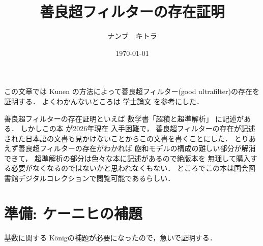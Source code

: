 \documentclass[leqno, a4paper, 12pt]{jsarticle}
\title{
善良超フィルターの存在証明
}
\author{ナンブ　キトラ}
\date{\today}
\begin{document}
\maketitle



この文章では
Kunen
\cite{kunen}の方法によって善良超フィルター(good ultrafilter)の存在を証明する．
よくわかんないところは
学士論文
\cite{bach}
を参考にした．

善良超フィルターの存在証明といえば
数学書「超積と超準解析」
\cite{saito}に記述がある．
しかしこの本
が2026年現在
入手困難で，
善良超フィルターの存在が記述された日本語の文書も見かけないことからこの文書を書くことにした．
とりあえず善良超フィルターの存在がわかれば
飽和モデルの構成の難しい部分が解消できて，
超準解析の部分は色々な本に記述があるので絶版本を
無理して購入する必要がなくなるのではないかと思われなくもない．
ところでこの本は国会図書館デジタルコレクションで閲覧可能であるらしい．

\section{準備: ケーニヒの補題}
基数に関する
K\"{o}nigの補題が必要になったので，急いで証明する．
\end{document}
